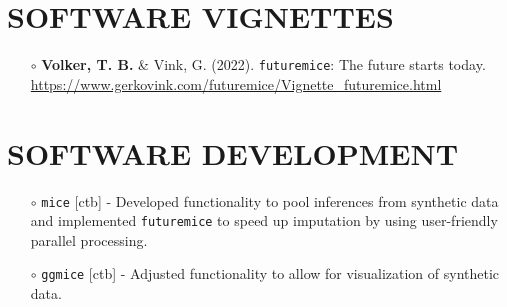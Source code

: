 \documentclass[11pt,a4paper,roman,colorlinks,linkcolor = blue]{moderncv}        %
\begin{document}
\section{SOFTWARE VIGNETTES}

\begin{itemize}
\item[$\circ$] \textbf{Volker, T. B.} \& Vink, G. (2022). \texttt{futuremice}: The future starts today. \url{https://www.gerkovink.com/futuremice/Vignette_futuremice.html}
\end{itemize}

\section{SOFTWARE DEVELOPMENT}

\begin{itemize}

\item[$\circ$] \texttt{mice} [ctb] - Developed functionality to pool inferences from synthetic data and implemented \texttt{futuremice} to speed up imputation by using user-friendly parallel processing.
\item[$\circ$] \texttt{ggmice} [ctb] - Adjusted functionality to allow for visualization of synthetic data.
  \end{itemize}


\end{document}
